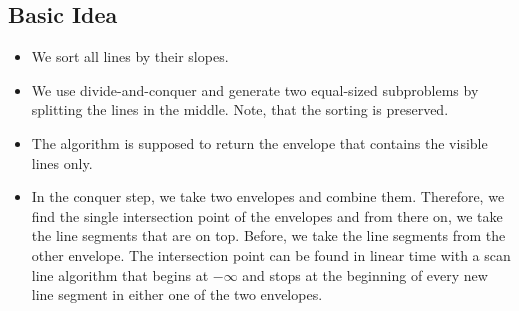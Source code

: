 \documentclass[12pt]{article}
\begin{document}
\subsection*{Basic Idea}
\begin{itemize}
	\item We sort all lines by their slopes.
	\item We use divide-and-conquer and generate two equal-sized subproblems by splitting the lines in the middle. Note, that the sorting is preserved.
	\item The algorithm is supposed to return the envelope that contains the visible lines only.
	\item In the conquer step, we take two envelopes and combine them. Therefore, we find the single intersection point of the envelopes and from there on, we take the line segments that are on top. Before, we take the line segments from the other envelope. The intersection point can be found in linear time with a scan line algorithm that begins at $-\infty$ and stops at the beginning of every new line segment in either one of the two envelopes.
\end{itemize}
\end{document}
